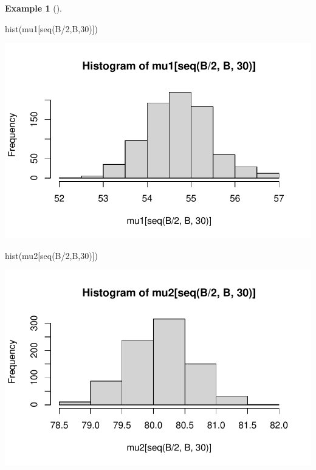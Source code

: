 \documentclass[
  letterpaper,
  DIV=11,
  numbers=noendperiod]{scrreprt}
\newenvironment{Shaded}{\begin{snugshade}}{\end{snugshade}}
\newcommand{\DecValTok}[1]{\textcolor[rgb]{0.68,0.00,0.00}{#1}}
\newcommand{\FunctionTok}[1]{\textcolor[rgb]{0.28,0.35,0.67}{#1}}
\newcommand{\NormalTok}[1]{\textcolor[rgb]{0.00,0.23,0.31}{#1}}
\newcommand{\SpecialCharTok}[1]{\textcolor[rgb]{0.37,0.37,0.37}{#1}}
\theoremstyle{definition}
\theoremstyle{plain}
\theoremstyle{definition}
\newtheorem{example}{Example}[chapter]
\theoremstyle{remark}
\begin{document}
\begin{example}[]
\begin{Shaded}
\begin{Highlighting}[]
\FunctionTok{hist}\NormalTok{(mu1[}\FunctionTok{seq}\NormalTok{(B}\SpecialCharTok{/}\DecValTok{2}\NormalTok{,B,}\DecValTok{30}\NormalTok{)])}
\end{Highlighting}
\end{Shaded}

\includegraphics{misturas_files/figure-pdf/unnamed-chunk-12-1.pdf}

\begin{Shaded}
\begin{Highlighting}[]
\FunctionTok{hist}\NormalTok{(mu2[}\FunctionTok{seq}\NormalTok{(B}\SpecialCharTok{/}\DecValTok{2}\NormalTok{,B,}\DecValTok{30}\NormalTok{)])}
\end{Highlighting}
\end{Shaded}

\includegraphics{misturas_files/figure-pdf/unnamed-chunk-12-2.pdf}


\end{example}
\end{document}
